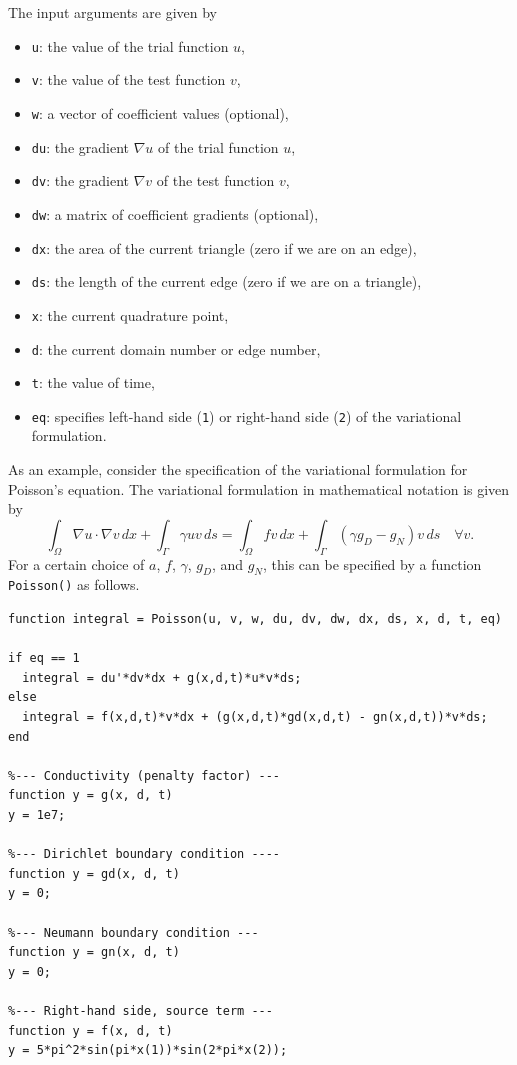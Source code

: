 \documentclass[12pt]{article}
\begin{document}
The input arguments are given by
\begin{itemize}
\item \texttt{u}:  the value of the trial function $u$,
\item \texttt{v}:  the value of the test function $v$,
\item \texttt{w}:  a vector of coefficient values (optional),
\item \texttt{du}: the gradient $\nabla u$ of the trial function $u$,
\item \texttt{dv}: the gradient $\nabla v$ of the test function $v$,
\item \texttt{dw}: a matrix of coefficient gradients (optional),
\item \texttt{dx}: the area of the current triangle (zero if we are on an edge),
\item \texttt{ds}: the length of the current edge (zero if we are on a triangle),
\item \texttt{x}:  the current quadrature point,
\item \texttt{d}:  the current domain number or edge number,
\item \texttt{t}:  the value of time,
\item \texttt{eq}: specifies left-hand side (\texttt{1}) or right-hand side (\texttt{2}) of the variational formulation.
\end{itemize}

As an example, consider the specification of the variational formulation for Poisson's equation.
The variational formulation in mathematical notation is given by
\begin{equation} \label{eq:varform}
  \int_{\Omega} \nabla u \cdot \nabla v \, dx +
  \int_{\Gamma} \gamma u v \, ds =
  \int_{\Omega} fv \, dx + \int_{\Gamma} (\gamma g_D - g_N) v \, ds 
  \quad \forall v.
\end{equation}
For a certain choice of $a$, $f$, $\gamma$, $g_D$, and $g_N$, this can be specified  by a function \texttt{Poisson()} as follows.

\begin{verbatim}
function integral = Poisson(u, v, w, du, dv, dw, dx, ds, x, d, t, eq)

if eq == 1
  integral = du'*dv*dx + g(x,d,t)*u*v*ds;
else
  integral = f(x,d,t)*v*dx + (g(x,d,t)*gd(x,d,t) - gn(x,d,t))*v*ds;
end

%--- Conductivity (penalty factor) ---
function y = g(x, d, t)
y = 1e7;

%--- Dirichlet boundary condition ----
function y = gd(x, d, t)
y = 0;

%--- Neumann boundary condition ---
function y = gn(x, d, t)
y = 0;

%--- Right-hand side, source term ---
function y = f(x, d, t)
y = 5*pi^2*sin(pi*x(1))*sin(2*pi*x(2));
\end{verbatim}
\end{document}

